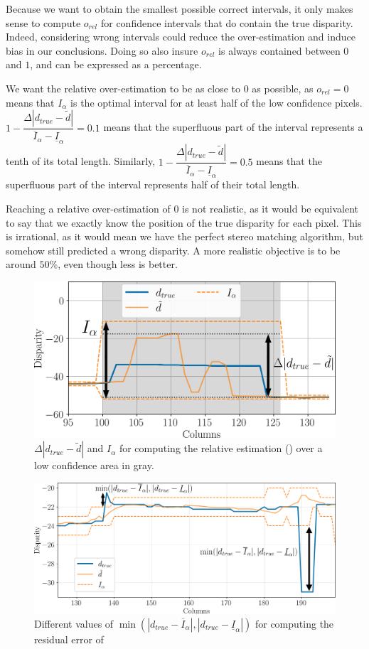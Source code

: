 Because we want to obtain the smallest possible correct intervals, it only makes sense to compute $o_{rel}$ for confidence intervals that do contain the true disparity. Indeed, considering wrong intervals could reduce the over-estimation and induce bias in our conclusions. Doing so also insure $o_{rel}$ is always contained between $0$ and $1$, and can be expressed as a percentage.

We want the relative over-estimation to be as close to $0$ as possible, as $o_{rel}=0$ means that $I_\alpha$ is the optimal interval for at least half of the low confidence pixels. $1-\dfrac{\Delta|d_{true}-\tilde{d}|}{\overline{I}_\alpha-\underline{I}_\alpha}=0.1$ means that the superfluous part of the interval represents a tenth of its total length. Similarly, $1-\dfrac{\Delta|d_{true}-\tilde{d}|}{\overline{I}_\alpha-\underline{I}_\alpha}=0.5$ means that the superfluous part of the interval represents half of their total length.

Reaching a relative over-estimation of $0$ is not realistic, as it would be equivalent to say that we exactly know the position of the true disparity for each pixel. This is irrational, as it would mean we have the perfect stereo matching algorithm, but somehow still predicted a wrong disparity. A more realistic objective is to be around $50\%$, even though less is better.

\begin{figure}
    \centering
    \includegraphics[width=0.8\linewidth]{Images/Chap_5/relative_overestimation_row_230.png}
    \caption{$\Delta|d_{true}-\tilde{d}|$ and $I_\alpha$ for computing the relative estimation () over a low confidence area in gray.}
    \label{fig:relative_overestimation}
\end{figure}

\begin{figure}
    \centering
    \includegraphics[width=0.8\linewidth]{Images/Chap_5/residual_error_row_108.png}
    \caption{Different values of $\min(|d_{true}-\overline{I}_\alpha|, |d_{true}-\underline{I}_\alpha|)$ for computing the residual error of }
    \label{fig:residual_error}
\end{figure}

